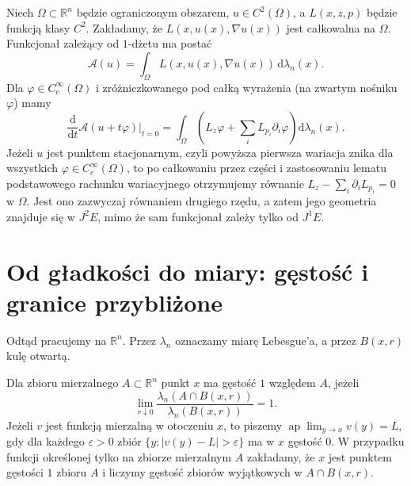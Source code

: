 \begin{przyklad}
Niech $\Omega\subset\mathbb R^n$ będzie ograniczonym obszarem,
$u\in C^2(\Omega)$, a $L(x,z,p)$ będzie funkcją klasy $C^2$.
Zakładamy, że $L(x,u(x),\nabla u(x))$ jest całkowalna na $\Omega$.
Funkcjonał zależący od $1$-dżetu ma postać
\[
 \mathcal A(u)=\int_\Omega L(x,u(x),\nabla u(x))
 \,\mathrm d\lambda_n(x).
\]
Dla $\varphi\in C_c^\infty(\Omega)$ i zróżniczkowanego
pod całką wyrażenia (na zwartym nośniku $\varphi$) mamy
\[
 \frac{\mathrm d}{\mathrm dt}\mathcal A(u+t\varphi)\big|_{t=0}
 =\int_\Omega\left(L_z\varphi+
 \sum_i L_{p_i}\partial_i\varphi\right)\mathrm d\lambda_n(x).
\]
Jeżeli $u$ jest punktem stacjonarnym, czyli powyższa
pierwsza wariacja znika dla wszystkich
$\varphi\in C_c^\infty(\Omega)$, to po całkowaniu
przez części i zastosowaniu lematu podstawowego rachunku
wariacyjnego otrzymujemy równanie
$L_z-\sum_i\partial_i L_{p_i}=0$ w $\Omega$.
Jest ono zazwyczaj równaniem drugiego rzędu, a zatem
jego geometria znajduje się w $J^2E$, mimo że
sam funkcjonał zależy tylko od $J^1E$.
\end{przyklad}

\section{Od gładkości do miary: gęstość i granice przybliżone}
Odtąd pracujemy na $\mathbb R^n$. Przez $\lambda_n$ oznaczamy
miarę Lebesgue'a, a przez $B(x,r)$ kulę otwartą.

\begin{definicja}
\label{def:dzety-ap-limit}
Dla zbioru mierzalnego $A\subset\mathbb R^n$ punkt $x$
ma gęstość $1$ względem $A$, jeżeli
\[
 \lim_{r\downarrow0}
 \frac{\lambda_n(A\cap B(x,r))}{\lambda_n(B(x,r))}=1.
\]
Jeżeli $v$ jest funkcją mierzalną w otoczeniu $x$,
to piszemy $\operatorname{ap}\!\lim_{y\to x}v(y)=L$,
gdy dla każdego $\varepsilon>0$ zbiór
$\{y:|v(y)-L|>\varepsilon\}$ ma w $x$ gęstość $0$.
W przypadku funkcji określonej tylko na zbiorze mierzalnym
$A$ zakładamy, że $x$ jest punktem gęstości $1$ zbioru $A$
i liczymy gęstość zbiorów wyjątkowych w $A\cap B(x,r)$.
\end{definicja}

